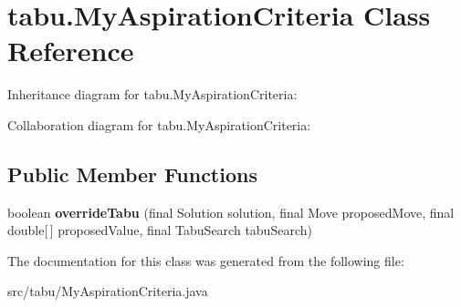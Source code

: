 \hypertarget{classtabu_1_1_my_aspiration_criteria}{}\section{tabu.\+My\+Aspiration\+Criteria Class Reference}
\label{classtabu_1_1_my_aspiration_criteria}


Inheritance diagram for tabu.\+My\+Aspiration\+Criteria\+:


Collaboration diagram for tabu.\+My\+Aspiration\+Criteria\+:
\subsection*{Public Member Functions}
\begin{DoxyCompactItemize}
\item 
boolean {\bfseries override\+Tabu} (final Solution solution, final Move proposed\+Move, final double\mbox{[}$\,$\mbox{]} proposed\+Value, final Tabu\+Search tabu\+Search)\hypertarget{classtabu_1_1_my_aspiration_criteria_ace6ad363b0f40e06b0dfb02ee8a38ac2}{}\label{classtabu_1_1_my_aspiration_criteria_ace6ad363b0f40e06b0dfb02ee8a38ac2}

\end{DoxyCompactItemize}


The documentation for this class was generated from the following file\+:\begin{DoxyCompactItemize}
\item 
src/tabu/My\+Aspiration\+Criteria.\+java\end{DoxyCompactItemize}
